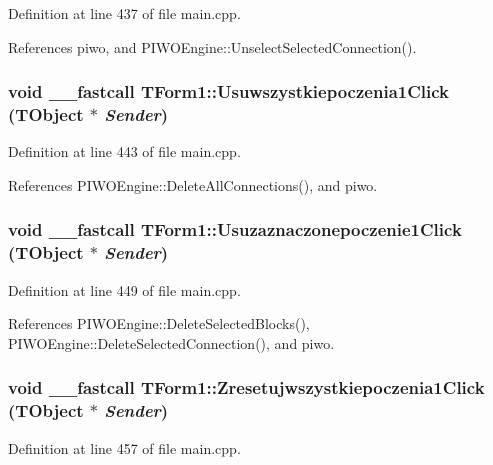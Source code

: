 Definition at line 437 of file main.cpp.

References piwo, and PIWOEngine::UnselectSelectedConnection().\hypertarget{classTForm1_fabef0363a8b392dc9bee0438cf334d0}{
\subsubsection[Usuwszystkiepoczenia1Click]{\setlength{\rightskip}{0pt plus 5cm}void \_\-\_\-fastcall TForm1::Usuwszystkiepoczenia1Click (TObject $\ast$ {\em Sender})}}
\label{classTForm1_fabef0363a8b392dc9bee0438cf334d0}




Definition at line 443 of file main.cpp.

References PIWOEngine::DeleteAllConnections(), and piwo.\hypertarget{classTForm1_87e9a6d2f937b88c477d046b2852109f}{
\subsubsection[Usuzaznaczonepoczenie1Click]{\setlength{\rightskip}{0pt plus 5cm}void \_\-\_\-fastcall TForm1::Usuzaznaczonepoczenie1Click (TObject $\ast$ {\em Sender})}}
\label{classTForm1_87e9a6d2f937b88c477d046b2852109f}




Definition at line 449 of file main.cpp.

References PIWOEngine::DeleteSelectedBlocks(), PIWOEngine::DeleteSelectedConnection(), and piwo.\hypertarget{classTForm1_013f6ffc037839e3f5251728a89fb168}{
\subsubsection[Zresetujwszystkiepoczenia1Click]{\setlength{\rightskip}{0pt plus 5cm}void \_\-\_\-fastcall TForm1::Zresetujwszystkiepoczenia1Click (TObject $\ast$ {\em Sender})}}
\label{classTForm1_013f6ffc037839e3f5251728a89fb168}




Definition at line 457 of file main.cpp.

